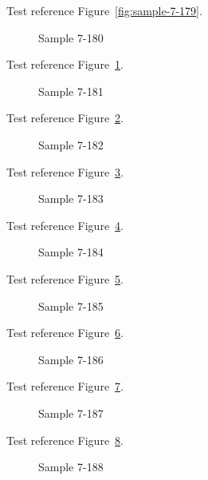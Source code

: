 Test reference Figure~\ref{fig:sample-7-179}.

\begin{figure}[tbhp]
\caption{Sample 7-180}
\label{fig:sample-7-180}
\end{figure}

Test reference Figure~\ref{fig:sample-7-180}.

\begin{figure}[tbhp]
\caption{Sample 7-181}
\label{fig:sample-7-181}
\end{figure}

Test reference Figure~\ref{fig:sample-7-181}.

\begin{figure}[tbhp]
\caption{Sample 7-182}
\label{fig:sample-7-182}
\end{figure}

Test reference Figure~\ref{fig:sample-7-182}.

\begin{figure}[tbhp]
\caption{Sample 7-183}
\label{fig:sample-7-183}
\end{figure}

Test reference Figure~\ref{fig:sample-7-183}.

\begin{figure}[tbhp]
\caption{Sample 7-184}
\label{fig:sample-7-184}
\end{figure}

Test reference Figure~\ref{fig:sample-7-184}.

\begin{figure}[tbhp]
\caption{Sample 7-185}
\label{fig:sample-7-185}
\end{figure}

Test reference Figure~\ref{fig:sample-7-185}.

\begin{figure}[tbhp]
\caption{Sample 7-186}
\label{fig:sample-7-186}
\end{figure}

Test reference Figure~\ref{fig:sample-7-186}.

\begin{figure}[tbhp]
\caption{Sample 7-187}
\label{fig:sample-7-187}
\end{figure}

Test reference Figure~\ref{fig:sample-7-187}.

\begin{figure}[tbhp]
\caption{Sample 7-188}
\label{fig:sample-7-188}
\end{figure}

